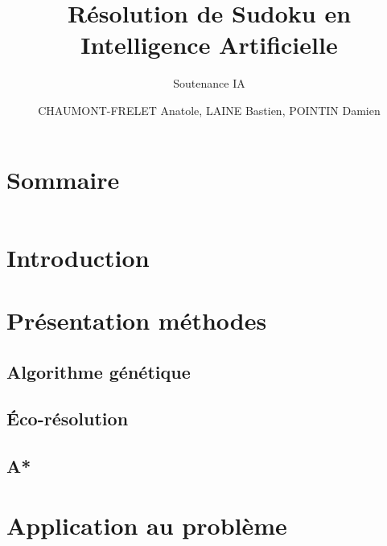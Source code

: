 \documentclass{beamer}
\title{Résolution de Sudoku en Intelligence Artificielle}
\subtitle{Soutenance IA}
\author{CHAUMONT-FRELET Anatole, LAINE Bastien, POINTIN Damien}
\institute{Génie Mathématique | INSA Rouen}
\begin{document}
    \beamertemplatenavigationsymbolsempty

    \begin{frame}
        \titlepage{}
    \end{frame}

    \section*{Sommaire}
        \begin{frame}
            \begin{columns}[t]
  				\begin{column}{5cm}
  					\tableofcontents[sections={1-4}]
  				\end{column}
  				\begin{column}{5cm}
  					\tableofcontents[sections={5-8}]
  				\end{column}
  			\end{columns}
        \end{frame}

    \section{Introduction}
        \subsection{}
            

    \section{Présentation méthodes}
        \subsection{Algorithme génétique}
            
        \subsection{Éco-résolution}
            
        \subsection{A*}
            
    \section{Application au problème}
\end{document}
